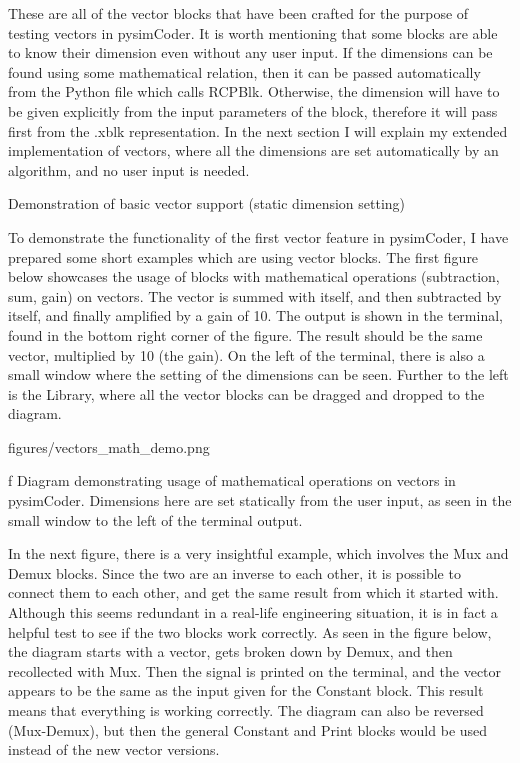 \quad These are all of the vector blocks that have been crafted for the purpose of testing vectors in
pysimCoder. It is worth mentioning that some blocks are able to know their dimension even without any user
input. If the dimensions can be found using some mathematical relation, then it can be passed automatically
from the Python file which calls RCPBlk. Otherwise, the dimension will have to be given explicitly from the
input parameters of the block, therefore it will pass first from the .xblk representation. In the next section
I will explain my extended implementation of vectors, where all the dimensions are set automatically by an
algorithm, and no user input is needed.

\secc Demonstration of basic vector support (static dimension setting)

\qquad To demonstrate the functionality of the first vector feature in pysimCoder, I have prepared some
short examples which are using vector blocks. The first figure below showcases the usage of blocks
with mathematical operations (subtraction, sum, gain) on vectors. The vector is summed with itself,
and then subtracted by itself, and finally amplified by a gain of 10. The output is shown in the terminal,
found in the bottom right corner of the figure. The result should be the same vector, multiplied
by 10 (the gain). On the left of the terminal, there is also a small window where the setting of the
dimensions can be seen. Further to the left is the Library, where all the vector blocks can be
dragged and dropped to the diagram.

\medskip {}
\picw=14cm \cinspic figures/vectors_math_demo.png
\caption/f Diagram demonstrating usage of mathematical operations on vectors in pysimCoder. Dimensions here
are set statically from the user input, as seen in the small window to the left of the terminal output.
\medskip

\quad In the next figure, there is a very insightful example, which involves the Mux and Demux blocks.
Since the two are an inverse to each other, it is possible to connect them to each other, and get the same
result from which it started with. Although this seems redundant in a real-life engineering situation, it is
in fact a helpful test to see if the two blocks work correctly. As seen in the figure below, the diagram
starts with a vector, gets broken down by Demux, and then recollected with Mux. Then the signal is printed
on the terminal, and the vector appears to be the same as the input given for the Constant block. This result
means that everything is working correctly. The diagram can also be reversed (Mux-Demux), but then the
general Constant and Print blocks would be used instead of the new vector versions.

